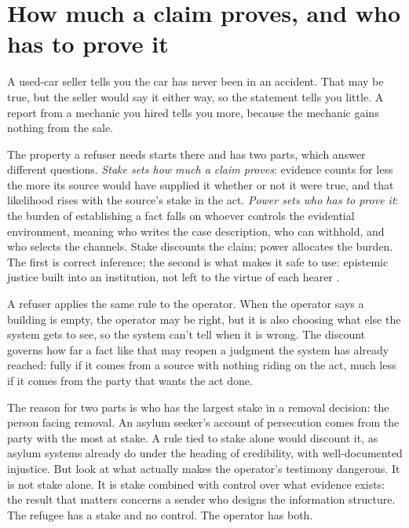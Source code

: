 \section{How much a claim proves, and who has to prove it}
\label{sec:22.1}
A used-car seller tells you the car has never been in an accident. That may be true, but the seller would say it either way, so the statement tells you little. A report from a mechanic you hired tells you more, because the mechanic gains nothing from the sale.

The property a refuser needs starts there and has two parts, which answer different questions. \emph{Stake sets how much a claim proves}: evidence counts for less the more its source would have supplied it whether or not it were true, and that likelihood rises with the source's stake in the act. \emph{Power sets who has to prove it}: the burden of establishing a fact falls on whoever controls the evidential environment, meaning who writes the case description, who can withhold, and who selects the channels. Stake discounts the claim; power allocates the burden. The first is correct inference; the second is what makes it safe to use: epistemic justice built into an institution, not left to the virtue of each hearer \autocite{fricker2007epistemic,anderson2012epistemic}.

A refuser applies the same rule to the operator. When the operator says a building is empty, the operator may be right, but it is also choosing what else the system gets to see, so the system can't tell when it is wrong.
The discount governs how far a fact like that may reopen a judgment the system has already reached: fully if it comes from a source with nothing riding on the act, much less if it comes from the party that wants the act done.


The reason for two parts is who has the largest stake in a removal decision: the person facing removal. An asylum seeker's account of persecution comes from the party with the most at stake. A rule tied to stake alone would discount it, as asylum systems already do under the heading of credibility, with well-documented injustice. But look at what actually makes the operator's testimony dangerous. It is not stake alone. It is stake combined with control over what evidence exists: the result that matters concerns a sender who designs the information structure. The refugee has a stake and no control. The operator has both.

